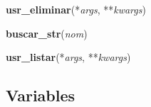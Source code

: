 \hspace{.8\funcindent}\begin{boxedminipage}{\funcwidth}

    \raggedright \textbf{usr\_eliminar}(*\textit{args}, **\textit{kwargs})

\setlength{\parskip}{2ex}
\setlength{\parskip}{1ex}
    \end{boxedminipage}

    \label{app:views:buscar_str}

    \vspace{0.5ex}

\hspace{.8\funcindent}\begin{boxedminipage}{\funcwidth}

    \raggedright \textbf{buscar\_str}(\textit{nom})

\setlength{\parskip}{2ex}
\setlength{\parskip}{1ex}
    \end{boxedminipage}

    \label{app:views:usr_listar}

    \vspace{0.5ex}

\hspace{.8\funcindent}\begin{boxedminipage}{\funcwidth}

    \raggedright \textbf{usr\_listar}(*\textit{args}, **\textit{kwargs})

\setlength{\parskip}{2ex}
\setlength{\parskip}{1ex}
    \end{boxedminipage}



  \subsection{Variables}

